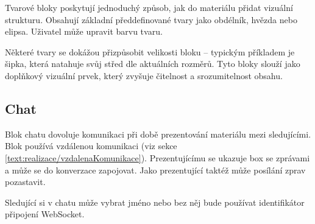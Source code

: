 Tvarové bloky poskytují jednoduchý způsob, jak do materiálu přidat vizuální strukturu. 
Obsahují základní předdefinované tvary jako obdélník, hvězda nebo elipsa. Uživatel může upravit barvu tvaru.

Některé tvary se dokážou přizpůsobit velikosti bloku -- typickým příkladem je šipka, která natahuje svůj střed dle aktuálních rozměrů.
Tyto bloky slouží jako doplňkový vizuální prvek, který zvyšuje čitelnost a srozumitelnost obsahu.

\subsection{Chat}

Blok chatu dovoluje komunikaci při době prezentování materiálu mezi sledujícími.
Blok používá vzdálenou komunikaci (viz sekce \ref{text:realizace/vzdalenaKomunikace}).
Prezentujícímu se ukazuje box se zprávami a může se do konverzace zapojovat.
Jako prezentující taktéž může posílání zprav pozastavit.

Sledující si v chatu může vybrat jméno nebo bez něj bude používat identifikátor připojení WebSocket.






